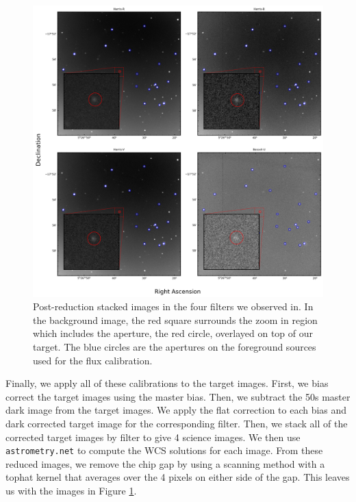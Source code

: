 \documentclass{aastex631}
\begin{document}
\begin{figure}[!h]
  \includegraphics[width=\textwidth]{../analysis/fcal-images.png}
  \caption{Post-reduction stacked images in the four filters we observed in. In the background image, the red square surrounds the zoom in region which includes the aperture, the red circle, overlayed on top of our target. The blue circles are the apertures on the foreground sources used for the flux calibration.}
  \label{fig:targ}
\end{figure}

Finally, we apply all of these calibrations to the target images. First, we bias correct the target images using the master bias. Then, we subtract the 50s master dark image from the target images. We apply the flat correction to each bias and dark corrected target image for the corresponding filter. Then, we stack all of the corrected target images by filter to give 4 science images. We then use \texttt{astrometry.net} \citep{lang2010} to compute the WCS solutions for each image. From these reduced images, we remove the chip gap by using a scanning method with a tophat kernel that averages over the 4 pixels on either side of the gap. This leaves us with the images in Figure \ref{fig:targ}. 
\end{document}
